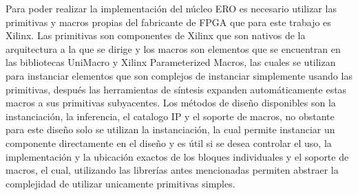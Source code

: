 	
\begin{table}[htbp]
  \centering
  \caption{Resumen de los resultados de implementación de las TRNGs}
  \label{tab:asdasd}
\end{table}


\newpage
	Para poder realizar la implementación del núcleo ERO es necesario utilizar las primitivas y macros propias del fabricante de FPGA que para este trabajo es Xilinx. Las primitivas son componentes de Xilinx que son nativos de la arquitectura a la que se dirige y los macros son elementos que se encuentran en las bibliotecas UniMacro y Xilinx Parameterized Macros, las cuales se utilizan para instanciar elementos que son complejos de instanciar simplemente usando las primitivas, después las herramientas de síntesis expanden automáticamente estas macros a sus primitivas subyacentes. Los métodos de diseño disponibles son la instanciación, la inferencia, el catalogo IP y el soporte de macros, no obstante para este diseño solo se utilizan la instanciación, la cual permite instanciar un componente directamente en el diseño y es útil si se desea controlar el uso, la implementación y la ubicación exactos de los bloques individuales y el soporte de macros, el cual, utilizando las librerías antes mencionadas permiten abstraer la complejidad de utilizar unicamente primitivas simples.
	
